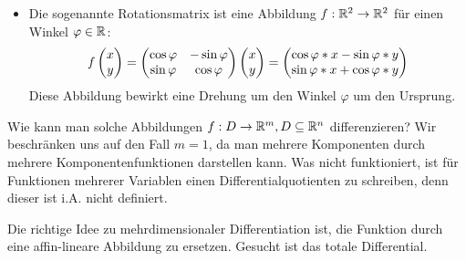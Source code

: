 \begin{itemize}
\begin{center}
	\end{center}

	\item Die sogenannte Rotationsmatrix ist eine Abbildung $f:\mathbb{R}^2\rightarrow\mathbb{R}^2$ für einen Winkel $\varphi\in\mathbb{R}$:
	\begin{equation*}
		f\vector{x\\y}=
		\matrix{\cos\varphi & -\sin\varphi\\\sin\varphi & \cos\varphi} \vector{x\\y}=
		\vector{\cos\varphi*x-\sin\varphi*y\\\sin\varphi*x+\cos\varphi*y}
	\end{equation*}
	Diese Abbildung bewirkt eine Drehung um den Winkel $\varphi$ um den Ursprung.
\end{itemize}

Wie kann man solche Abbildungen $f:D\rightarrow\mathbb{R}^m,D\subseteq\mathbb{R}^n$ differenzieren?
Wir beschränken uns auf den Fall $m=1$, da man mehrere Komponenten durch mehrere Komponentenfunktionen darstellen kann.
Was nicht funktioniert, ist für Funktionen mehrerer Variablen einen Differentialquotienten zu schreiben, denn dieser ist i.A. nicht definiert.

Die richtige Idee zu mehrdimensionaler Differentiation ist, die Funktion durch eine affin-lineare Abbildung zu ersetzen. Gesucht ist das totale Differential.

